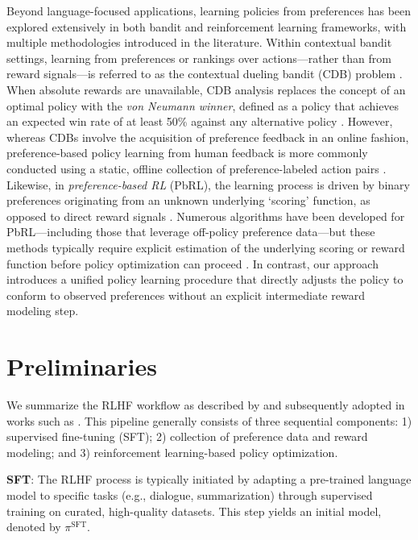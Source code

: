 Beyond language-focused applications, learning policies from preferences has been explored extensively in both bandit and reinforcement learning frameworks, with multiple methodologies introduced in the literature. Within contextual bandit settings, learning from preferences or rankings over actions—rather than from reward signals—is referred to as the contextual dueling bandit (CDB) problem \citep{yue2012karmed,dudik2015contextual}. When absolute rewards are unavailable, CDB analysis replaces the concept of an optimal policy with the \textit{von Neumann winner}, defined as a policy that achieves an expected win rate of at least 50\% against any alternative policy \citep{dudik2015contextual}. However, whereas CDBs involve the acquisition of preference feedback in an online fashion, preference-based policy learning from human feedback is more commonly conducted using a static, offline collection of preference-labeled action pairs \citep{yan2022human}. Likewise, in \textit{preference-based RL} (PbRL), the learning process is driven by binary preferences originating from an unknown underlying `scoring' function, as opposed to direct reward signals \citep{BusaFekete2014,ruiz2023dueling}. Numerous algorithms have been developed for PbRL—including those that leverage off-policy preference data—but these methods typically require explicit estimation of the underlying scoring or reward function before policy optimization can proceed \citep{jain2013learning,BusaFekete2014,christiano2017deep,sadigh2017active,kupcsik2018learning}. In contrast, our approach introduces a unified policy learning procedure that directly adjusts the policy to conform to observed preferences without an explicit intermediate reward modeling step.

\section{Preliminaries}\label{section:prelims}

We summarize the RLHF workflow as described by \citeauthor{ziegler2020finetuning} and subsequently adopted in works such as \citep{stiennon2022learning, bai2022training, ouyang2022training}. This pipeline generally consists of three sequential components: 1) supervised fine-tuning (SFT); 2) collection of preference data and reward modeling; and 3) reinforcement learning-based policy optimization.

\textbf{SFT}: The RLHF process is typically initiated by adapting a pre-trained language model to specific tasks (e.g., dialogue, summarization) through supervised training on curated, high-quality datasets. This step yields an initial model, denoted by $\pi^\text{SFT}$.

